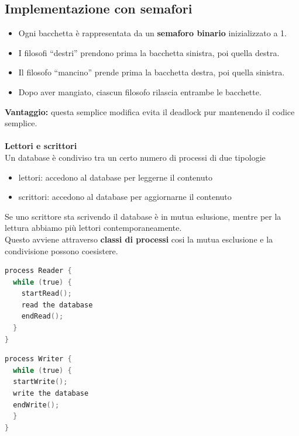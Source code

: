 \documentclass[a4paper,12pt]{article}
\begin{document}
\subsection*{Implementazione con semafori}
\begin{itemize}
    \item Ogni bacchetta è rappresentata da un \textbf{semaforo binario} inizializzato a 1.
    \item I filosofi ``destri'' prendono prima la bacchetta sinistra, poi quella destra.
    \item Il filosofo ``mancino'' prende prima la bacchetta destra, poi quella sinistra.
    \item Dopo aver mangiato, ciascun filosofo rilascia entrambe le bacchette.
\end{itemize}

\noindent
\textbf{Vantaggio:} questa semplice modifica evita il deadlock pur mantenendo il codice semplice. \\
\vspace{3em} \\
\textbf{Lettori e scrittori\\}
Un database è condiviso tra un certo numero di processi di due tipologie
\begin{itemize}
  \item lettori: accedono al database per leggerne il contenuto
  \item scrittori: accedono al database per aggiornarne il contenuto
\end{itemize}
Se uno scrittore sta scrivendo il database è in mutua eslusione, mentre per la lettura abbiamo più lettori contemporaneamente. \\
Questo avviene attraverso \textbf{classi di processi} cosi la mutua esclusione e la condivisione possono coesistere. \\
\begin{minipage}{0.48\textwidth}
\begin{lstlisting}[language=C]
process Reader {
  while (true) {
    startRead();
    read the database
    endRead();
  }
}
\end{lstlisting}
\end{minipage}
\hfill
\begin{minipage}{0.48\textwidth}
\begin{lstlisting}[language=C]
process Writer {
  while (true) {
  startWrite();
  write the database
  endWrite();
  }
}
\end{lstlisting}
\end{minipage} \\
\end{document}
